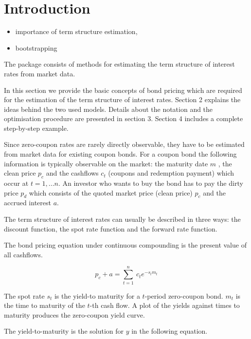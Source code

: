 \section{Introduction}

\begin{itemize}
\item importance of term structure estimation, \cite{BIS2005, Bolder1999, Bliss1997, Ioannides2003, Diebold2006, Nawalkha2005}
\item bootstrapping
\end{itemize}

\cite{BIS2005}


The  package  consists of methods for estimating the term structure of interest rates from market data.

In this section we provide the basic concepts of bond pricing which are required for the estimation of the term structure of interest rates. Section 2 explains the ideas behind the two used models. Details about the notation and the optimisation procedure are presented in section 3. Section 4 includes a complete step-by-step example.


Since zero-coupon rates are rarely directly observable, they have to be estimated from market data for existing coupon bonds. For a coupon bond the following information is typically observable on the market: the maturity date $m$ , the clean price $p_c$ and the cashflows $c_t$ (coupons and redemption payment) which occur at $t=1,...n$. An investor who wants to buy the bond has to pay the dirty price $p_d$ which consists of the quoted market price (clean price) $p_c$ and the accrued interest $a$.

The term structure of interest rates can usually be described in three ways: the discount function, the
spot rate function and the forward rate function.

The bond pricing equation under continuous compounding is the present value of all cashflows.

\begin{equation}
  \label{bondpriceeq}
  p_c+a = \sum_{t=1}^n \ c_t e^{-s_tm_t}
\end{equation}

The spot rate $s_t$ is the yield-to maturity for a $t$-period zero-coupon bond. $m_t$ is the time to maturity of the $t$-th cash flow. A plot of the yields against times to maturity produces the zero-coupon yield curve.

The yield-to-maturity is the solution for $y$ in the following equation.

